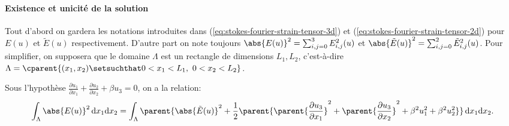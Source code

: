 \paragraph{Existence et unicité de la solution}
Tout d'abord on gardera les notations introduites dans
(\ref{eq:stokes-fourier-strain-tensor-3d}) et
(\ref{eq:stokes-fourier-strain-tensor-2d}) pour $E(u)$ et $\tilde E(u)$
respectivement. D'autre part on note toujours $\abs{E(u)}^2 =
\sum_{i,j = 0}^3E_{i,j}^2(u)$ et $\abs{\tilde E(u)}^2 = \sum_{i,j =
  0}^2\tilde E_{i,j}^2(u)$. Pour simplifier, on supposera que le
domaine $\Lambda$ est un rectangle de dimensions $L_1,L_2$,
c'est-à-dire $\Lambda = \cparent{(x_1, x_2) \setsuchthat
  0<x_1<L_1,\ 0<x_2<L_2}$.

\begin{lemme}\label{lem:lemme-1}
  Sous l'hypothèse $\frac{\partial u_1}{\partial x_1} +
  \frac{\partial u_2}{\partial x_2} + \beta u_3 = 0$, on a la
  relation:
  \begin{equation}
    \int_\Lambda \abs{E(u)}^2\,\mathrm dx_1\mathrm dx_2 %
    = \int_\Lambda \parent{\abs{\tilde E(u)}^2 %
      + \frac{1}{2}\parent{  \parent{\frac{\partial u_3}{\partial x_1}}^2 %
                           + \parent{\frac{\partial u_3}{\partial x_2}}^2 %
                           + \beta^2 u_1^2 %
                           + \beta^2 u_2^2}}\,\mathrm dx_1\mathrm dx_2.
  \end{equation}
\end{lemme}

